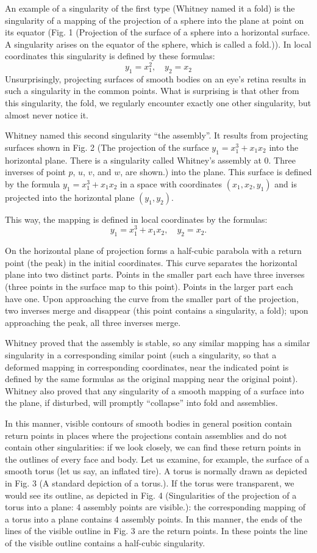 \documentclass[12pt]{amsart}
\begin{document}
An example of a singularity of the first type (Whitney named it a fold) is the
singularity of a mapping of the projection of a sphere into the plane at point
on its equator (Fig. 1 (Projection of the surface of a sphere into a horizontal
surface.
A singularity arises on the equator of the sphere, which is called a fold.)).
In local coordinates this singularity is defined by these formulas:
$$y_1=x_1^2,\quad y_2=x_2$$
Unsurprisingly, projecting surfaces of smooth bodies on an eye's retina results
in such a singularity in the common points.
What is surprising is that other from this singularity, the fold, we regularly
encounter exactly one other singularity, but almost never notice it.

Whitney named this second singularity ``the assembly''.
It results from projecting surfaces shown in Fig. 2 (The projection of the
surface $y_1=x_1^3+x_1x_2$ into the horizontal plane.
There is a singularity called Whitney's assembly at 0.
Three inverses of point $p$, $u$, $v$, and $w$, are shown.) into the plane.
This surface is defined by the formula $y_1=x_1^3+x_1x_2$ in a space with
coordinates $(x_1,x_2,y_1)$ and is projected into the horizontal plane
$(y_1,y_2)$.

This way, the mapping is defined in local coordinates by the formulas:
$$y_1=x_1^3+x_1x_2,\quad y_2=x_2.$$

On the horizontal plane of projection forms a half-cubic parabola with a return
point (the peak) in the initial coordinates.
This curve separates the horizontal plane into two distinct parts.
Points in the smaller part each have three inverses (three points in the surface
map to this point).
Points in the larger part each have one.
Upon approaching the curve from the smaller part of the projection, two inverses
merge and disappear (this point contains a singularity, a fold); upon
approaching the peak, all three inverses merge.

Whitney proved that the assembly is stable, so any similar mapping has a
similar singularity in a corresponding similar point (such a singularity, so
that a deformed mapping in corresponding coordinates, near the indicated point
is defined by the same formulas as the original mapping near the original point).
Whitney also proved that any singularity of a smooth mapping of a surface into
the plane, if disturbed, will promptly ``collapse'' into fold and assemblies.

In this manner, visible contours of smooth bodies in general position contain
return points in places where the projections contain assemblies and do not
contain other singularities: if we look closely, we can find these return points
in the outlines of every face and body.
Let us examine, for example, the surface of a smooth torus (let us say, an
inflated tire).
A torus is normally drawn as depicted in Fig. 3 (A standard depiction of a
torus.).
If the torus were transparent, we would see its outline, as depicted in Fig. 4
(Singularities of the projection of a torus into a plane: 4 assembly points are
visible.): the corresponding mapping of a torus into a plane contains 4 assembly
points.
In this manner, the ends of the lines of the visible outline in Fig. 3 are the
return points.
In these points the line of the visible outline contains a half-cubic singularity.
\end{document}
